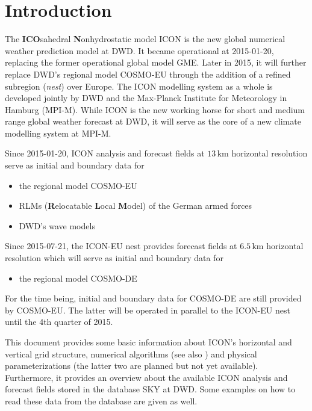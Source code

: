 \chapter{Introduction}

The \textbf{ICO}sahedral \textbf{N}onhydrostatic model ICON is the new global numerical 
weather prediction model at DWD. It became operational at 2015-01-20, replacing the former  
operational global model GME. Later in 2015, it will further replace DWD's regional model COSMO-EU  
through the addition of a refined subregion (\emph{nest}) over Europe. The ICON modelling system 
as a whole is developed jointly by DWD and the Max-Planck Institute for Meteorology in Hamburg (MPI-M). 
While ICON is the new working horse for short and medium range global weather forecast at DWD, it will 
serve as the core of a new climate modelling system at MPI-M.

Since 2015-01-20, ICON analysis and forecast fields at $13\,\mathrm{km}$ horizontal resolution 
serve as initial and boundary data for
\begin{itemize}
 \item the regional model COSMO-EU
 \item RLMs (\textbf{R}elocatable \textbf{L}ocal \textbf{M}odel) of the German armed forces
 \item DWD's wave models
\end{itemize}

Since 2015-07-21, the ICON-EU nest provides forecast fields at $6.5\,\mathrm{km}$ horizontal resolution
which will serve as initial and boundary data for
\begin{itemize}
 \item the regional model COSMO-DE
\end{itemize}
For the time being, initial and boundary data for COSMO-DE are still provided by COSMO-EU. The 
latter will be operated in parallel to the ICON-EU nest until the 4th quarter of 2015.

This document provides some basic information about ICON's horizontal and vertical grid structure, 
numerical algorithms (see also \cite{Zaengl15}) and physical parameterizations (the latter two are 
planned but not yet available). Furthermore, it provides an overview about the available ICON analysis 
and forecast fields stored in the database SKY at DWD. Some examples on how to read these data from 
the database are given as well.

